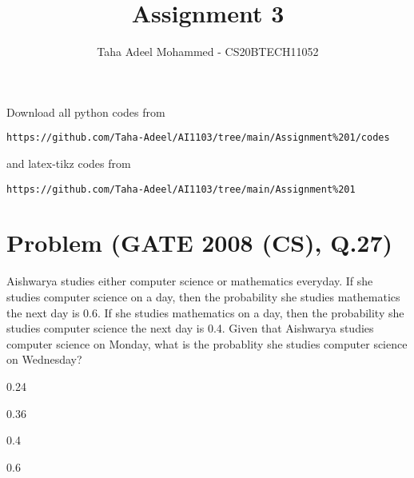 \documentclass[journal,12pt,twocolumn]{IEEEtran}
\begin{document}
     \def\rightbox#1{\makebox[0in][r]{#1}}
     \def\centbox#1{\makebox[0in]{#1}}
     \def\topbox#1{\raisebox{-\baselineskip}[0in][0in]{#1}}
     \def\midbox#1{\raisebox{-0.5\baselineskip}[0in][0in]{#1}}
\vspace{3cm}
\title{Assignment 3}
\author{Taha Adeel Mohammed - CS20BTECH11052}
\maketitle
\newpage
\bigskip
\renewcommand{\thefigure}{\theenumi}
\renewcommand{\thetable}{\theenumi}
Download all python codes from 
\begin{lstlisting}
https://github.com/Taha-Adeel/AI1103/tree/main/Assignment%201/codes
\end{lstlisting}
%
and latex-tikz codes from 
%
\begin{lstlisting}
https://github.com/Taha-Adeel/AI1103/tree/main/Assignment%201
\end{lstlisting}
\section{Problem (GATE 2008 (CS), Q.27)}
Aishwarya studies either computer science or mathematics everyday. If she studies computer science on a day, then the probability she studies mathematics the next day is 0.6. If she studies mathematics on a day, then the probability she studies computer science the next day is 0.4.
Given that Aishwarya studies computer science on Monday, what is the probablity she studies computer science on Wednesday?
\begin{enumerate}[label=(\Alph*)]
\begin{multicols}{2}
\item 0.24
\item 0.36
\item 0.4
\item 0.6
\end{multicols}
\end{enumerate}
\end{document}
